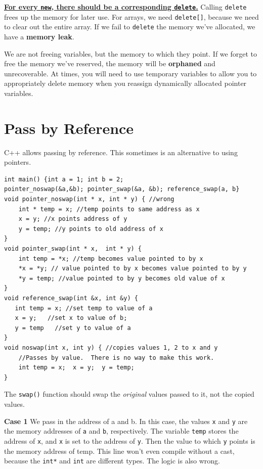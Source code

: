 \documentclass[12pt]{article}
\begin{document}
\underline{\textbf{For every \texttt{new}, there should be a
    corresponding \texttt{delete}.}}  Calling \texttt{delete} frees up
the memory for later use.  For arrays, we need \texttt{delete[]},
because we need to clear out the entire array.  If we fail to
\texttt{delete} the memory we've allocated, we have a \textbf{memory
  leak}.

We are not freeing variables, but the memory to which they point.  If
we forget to free the memory we've reserved, the memory will be
\textbf{orphaned} and unrecoverable.  At times, you will need to use
temporary variables to allow you to appropriately delete memory when
you reassign dynamically allocated pointer variables.
\section{Pass by Reference}

C++ allows passing by reference.  This sometimes is an alternative to
using pointers.
\begin{verbatim}
int main() {int a = 1; int b = 2; 
pointer_noswap(&a,&b); pointer_swap(&a, &b); reference_swap(a, b}
void pointer_noswap(int * x, int * y) { //wrong
    int * temp = x; //temp points to same address as x
    x = y; //x points address of y
    y = temp; //y points to old address of x
}
void pointer_swap(int * x,  int * y) {
    int temp = *x; //temp becomes value pointed to by x
    *x = *y; // value pointed to by x becomes value pointed to by y
    *y = temp; //value pointed to by y becomes old value of x
}
void reference_swap(int &x, int &y) {
   int temp = x; //set temp to value of a
   x = y;   //set x to value of b;
   y = temp   //set y to value of a
}
void noswap(int x, int y) { //copies values 1, 2 to x and y
    //Passes by value.  There is no way to make this work.
    int temp = x;  x = y;  y = temp;
}
\end{verbatim}
\label{code:point_ref}
The \texttt{swap()} function should swap the \textit{original} values
passed to it, not the copied values.

\textbf{Case 1} We pass in the address of a and b.  In this case, the
values \texttt{x} and \texttt{y} are the memory addresses of
\texttt{a} and \texttt{b}, respectively. The variable \texttt{temp}
stores the address of \texttt{x}, and \texttt{x} is set to the address
of \texttt{y}. Then the value to which \texttt{y} points is the memory
address of temp. This line won't even compile without a cast, because
the \texttt{int*} and \texttt{int} are different types. The logic is
also wrong.
\end{document}
